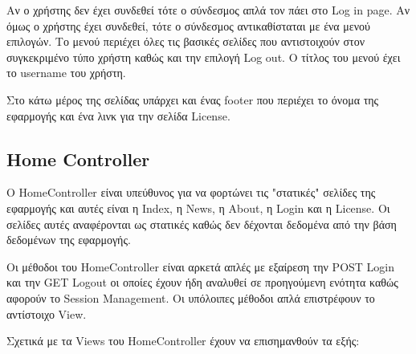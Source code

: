 \documentclass[12pt]{article}
\begin{document}

Αν ο χρήστης δεν έχει συνδεθεί τότε ο σύνδεσμος απλά τον πάει στο Log in page. Αν όμως ο χρήστης έχει συνδεθεί, τότε ο σύνδεσμος αντικαθίσταται με ένα μενού επιλογών. Το μενού περιέχει όλες τις βασικές σελίδες που αντιστοιχούν στον συγκεκριμένο τύπο χρήστη καθώς και την επιλογή Log out. Ο τίτλος του μενού έχει το username του χρήστη.

Στο κάτω μέρος της σελίδας υπάρχει και ένας footer που περιέχει το όνομα της εφαρμογής και ένα λινκ για την σελίδα License.

\subsection{Home Controller}
Ο HomeController είναι υπεύθυνος για να φορτώνει τις "στατικές" σελίδες της εφαρμογής και αυτές είναι η Index, η News, η About, η Login και η License. Οι σελίδες αυτές αναφέρονται ως στατικές καθώς δεν δέχονται δεδομένα από την βάση δεδομένων της εφαρμογής.

Οι μέθοδοι του HomeController είναι αρκετά απλές με εξαίρεση την POST Login και την GET Logout οι οποίες έχουν ήδη αναλυθεί σε προηγούμενη ενότητα καθώς αφορούν το Session Management. Οι υπόλοιπες μέθοδοι απλά επιστρέφουν το αντίστοιχο View.

Σχετικά με τα Views του HomeController έχουν να επισημανθούν τα εξής:
\end{document}
